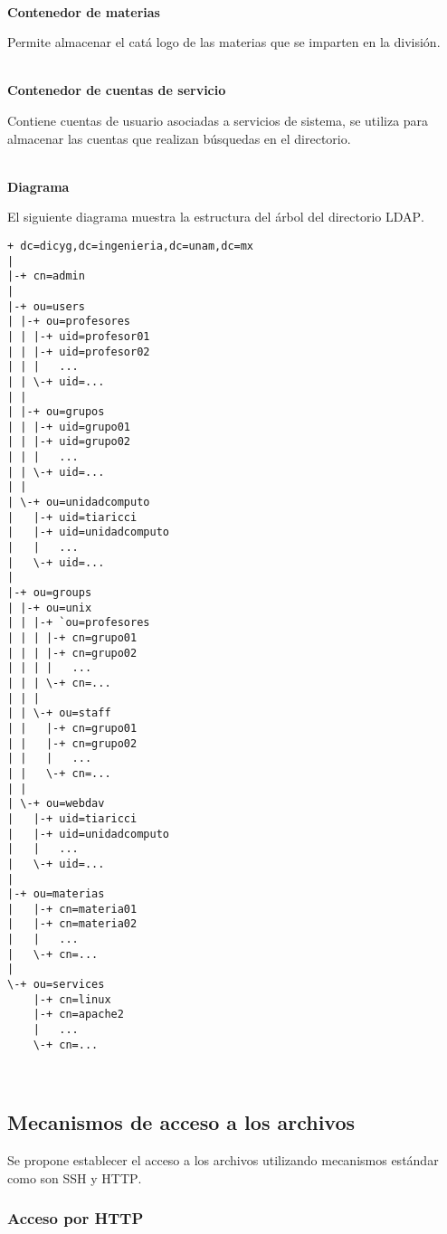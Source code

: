 \textbf{\\ Contenedor de materias \\}

Permite almacenar el cat\'{a} logo de las materias que se imparten en la divisi\'{o}n.

\textbf{\\ Contenedor de cuentas de servicio \\}

Contiene cuentas de usuario asociadas a servicios de sistema, se utiliza para almacenar las cuentas que realizan b\'{u}squedas en el directorio.

\textbf{\\ Diagrama \\}

El siguiente diagrama muestra la estructura del \'{a}rbol del directorio \textsc{LDAP}.

{
\scriptsize
\linespread{1}
\begin{verbatim}
+ dc=dicyg,dc=ingenieria,dc=unam,dc=mx
|
|-+ cn=admin
|
|-+ ou=users
| |-+ ou=profesores
| | |-+ uid=profesor01
| | |-+ uid=profesor02
| | |   ...
| | \-+ uid=...
| |
| |-+ ou=grupos
| | |-+ uid=grupo01
| | |-+ uid=grupo02
| | |   ...
| | \-+ uid=...
| |
| \-+ ou=unidadcomputo
|   |-+ uid=tiaricci
|   |-+ uid=unidadcomputo
|   |   ...  
|   \-+ uid=...
|  
|-+ ou=groups
| |-+ ou=unix
| | |-+ `ou=profesores
| | | |-+ cn=grupo01
| | | |-+ cn=grupo02
| | | |   ...
| | | \-+ cn=...
| | |
| | \-+ ou=staff
| |   |-+ cn=grupo01
| |   |-+ cn=grupo02
| |   |   ...
| |   \-+ cn=...
| |  
| \-+ ou=webdav
|   |-+ uid=tiaricci
|   |-+ uid=unidadcomputo
|   |   ...  
|   \-+ uid=...
|
|-+ ou=materias
|   |-+ cn=materia01
|   |-+ cn=materia02
|   |   ...
|   \-+ cn=...
|
\-+ ou=services
    |-+ cn=linux
    |-+ cn=apache2
    |   ...
    \-+ cn=...
\end{verbatim}
}
\

      \subsection {Mecanismos de acceso a los archivos}

Se propone establecer el acceso a los archivos utilizando mecanismos est\'{a}ndar como son \textsc{SSH} y \textsc{HTTP}.

        \subsubsection {Acceso por HTTP}

